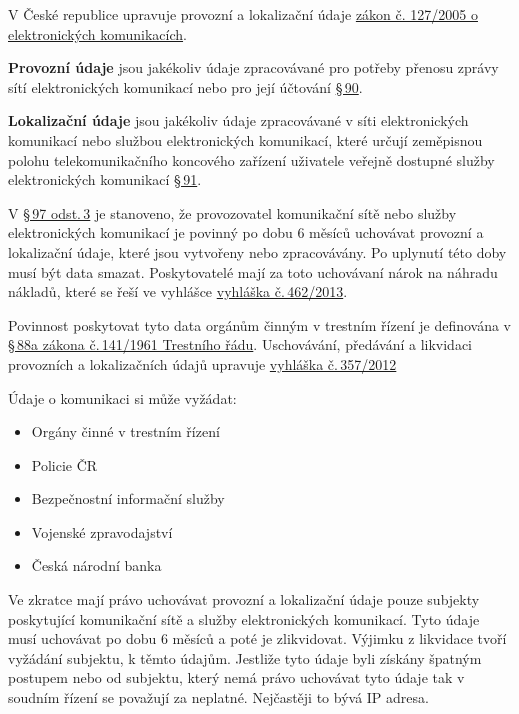V České republice upravuje provozní a lokalizační údaje \href{https://www.zakonyprolidi.cz/cs/2005-127}{zákon č. 127/2005 o elektronických komunikacích}.

\textbf{Provozní údaje} jsou jakékoliv údaje zpracovávané pro potřeby přenosu zprávy sítí elektronických komunikací nebo pro její účtování \href{https://www.zakonyprolidi.cz/cs/2005-127#p90-1}{§\,90}. 

\textbf{Lokalizační údaje} jsou jakékoliv údaje zpracovávané v síti elektronických komunikací nebo službou elektronických komunikací, které určují zeměpisnou polohu telekomunikačního koncového zařízení uživatele veřejně dostupné služby elektronických komunikací \href{https://www.zakonyprolidi.cz/cs/2005-127#p91-1}{§\,91}.

V \href{https://www.zakonyprolidi.cz/cs/2005-127#p97-3}{§\,97 odst.\,3} je stanoveno, že provozovatel komunikační sítě nebo služby elektronických komunikací je povinný po dobu 6 měsíců uchovávat provozní a lokalizační údaje, které jsou vytvořeny nebo zpracovávány. Po uplynutí této doby musí být data smazat. Poskytovatelé mají za toto uchovávaní nárok na náhradu nákladů, které se řeší ve vyhlášce \href{https://www.zakonyprolidi.cz/cs/2013-462/zneni-20140101}{vyhláška č.\,462/2013}.

Povinnost poskytovat tyto data orgánům činným v trestním řízení je definována v \href{https://www.zakonyprolidi.cz/cs/1961-141#p88a}{§\,88a zákona č.\,141/1961 Trestního řádu}. Uschovávání, předávání a likvidaci provozních a lokalizačních údajů upravuje \href{https://www.zakonyprolidi.cz/cs/2012-357}{vyhláška č.\,357/2012}

Údaje o komunikaci si může vyžádat:
\begin{itemize}[noitemsep]
    \item Orgány činné v trestním řízení
    \item Policie ČR
    \item Bezpečnostní informační služby
    \item Vojenské zpravodajství
    \item Česká národní banka
\end{itemize}

Ve zkratce mají právo uchovávat provozní a lokalizační údaje pouze subjekty poskytující komunikační sítě a služby elektronických komunikací. Tyto údaje musí uchovávat po dobu 6 měsíců a poté je zlikvidovat. Výjimku z likvidace tvoří vyžádání subjektu, k těmto údajům. Jestliže tyto údaje byli získány špatným postupem nebo od subjektu, který nemá právo uchovávat tyto údaje tak v soudním řízení se považují za neplatné. Nejčastěji to bývá IP adresa.


















